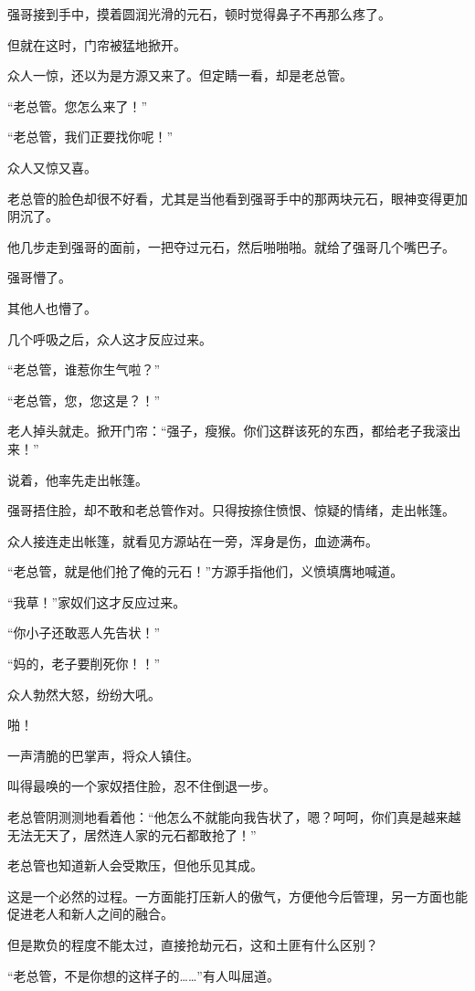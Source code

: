 \begin{this_body}
强哥接到手中，摸着圆润光滑的元石，顿时觉得鼻子不再那么疼了。

但就在这时，门帘被猛地掀开。

众人一惊，还以为是方源又来了。但定睛一看，却是老总管。

“老总管。您怎么来了！”

“老总管，我们正要找你呢！”

众人又惊又喜。

老总管的脸色却很不好看，尤其是当他看到强哥手中的那两块元石，眼神变得更加阴沉了。

他几步走到强哥的面前，一把夺过元石，然后啪啪啪。就给了强哥几个嘴巴子。

强哥懵了。

其他人也懵了。

几个呼吸之后，众人这才反应过来。

“老总管，谁惹你生气啦？”

“老总管，您，您这是？！”

老人掉头就走。掀开门帘：“强子，瘦猴。你们这群该死的东西，都给老子我滚出来！”

说着，他率先走出帐篷。

强哥捂住脸，却不敢和老总管作对。只得按捺住愤恨、惊疑的情绪，走出帐篷。

众人接连走出帐篷，就看见方源站在一旁，浑身是伤，血迹满布。

“老总管，就是他们抢了俺的元石！”方源手指他们，义愤填膺地喊道。

“我草！”家奴们这才反应过来。

“你小子还敢恶人先告状！”

“妈的，老子要削死你！！”

众人勃然大怒，纷纷大吼。

啪！

一声清脆的巴掌声，将众人镇住。

叫得最唤的一个家奴捂住脸，忍不住倒退一步。

老总管阴测测地看着他：“他怎么不就能向我告状了，嗯？呵呵，你们真是越来越无法无天了，居然连人家的元石都敢抢了！”

老总管也知道新人会受欺压，但他乐见其成。

这是一个必然的过程。一方面能打压新人的傲气，方便他今后管理，另一方面也能促进老人和新人之间的融合。

但是欺负的程度不能太过，直接抢劫元石，这和土匪有什么区别？

“老总管，不是你想的这样子的……”有人叫屈道。


\end{this_body}
